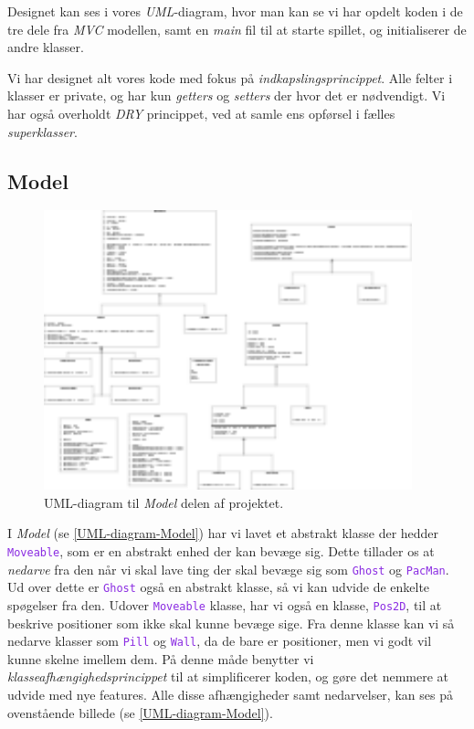 \documentclass{article}
\newcommand{\class}[1]{\textcolor{BlueViolet}{\small\texttt{#1}}}
\theoremstyle{mytheoremstyle}
\theoremstyle{mytheoremstyle}
\theoremstyle{myproblemstyle}
\begin{document}
Designet kan ses i vores \textit{UML}-diagram, hvor man kan se vi har opdelt
koden i de tre dele fra \textit{MVC} modellen, samt en \textit{main} fil til at
starte spillet, og initialiserer de andre klasser.

Vi har designet alt vores kode med fokus på \textit{indkapslingsprincippet}.
Alle felter i klasser er private, og har kun \textit{getters} og
\textit{setters} der hvor det er nødvendigt. Vi har også overholdt \textit{DRY}
princippet, ved at samle ens opførsel i fælles \textit{superklasser}.


\subsection{Model}\label{sub:Model} %
\begin{figure}[H]
    \begin{center}
        \includegraphics[width=0.95\textwidth]{figures/UML-diagram-model.png}
    \end{center}
    \caption{UML-diagram til \textit{Model} delen af projektet.}
    \label{UML-diagram-Model}
\end{figure}

I \textit{Model} (se \autoref{UML-diagram-Model}) har vi lavet et abstrakt klasse der
hedder \class{Moveable}, som er en abstrakt enhed der kan bevæge sig. Dette
tillader os at \textit{nedarve} fra den når vi skal lave ting der skal bevæge
sig som \class{Ghost} og \class{PacMan}. Ud over dette er \class{Ghost} også en
abstrakt klasse, så vi kan udvide de enkelte spøgelser fra den. Udover
\class{Moveable} klasse, har vi også en klasse, \class{Pos2D}, til at
beskrive positioner som ikke skal kunne bevæge sige. Fra denne klasse kan vi så
nedarve klasser som \class{Pill} og \class{Wall}, da de bare er positioner, men vi
godt vil kunne skelne imellem dem. På denne måde benytter vi
\textit{klasseafhængighedsprincippet} til at simplificerer koden, og gøre det
nemmere at udvide med nye features.
Alle disse afhængigheder samt nedarvelser, kan ses på ovenstående billede (se \autoref{UML-diagram-Model}).
\end{document}
